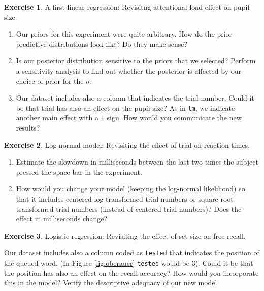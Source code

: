 \documentclass[12pt,]{krantz}
\providecommand{\tightlist}{%
  \setlength{\itemsep}{0pt}\setlength{\parskip}{0pt}}
\theoremstyle{definition}
\theoremstyle{definition}
\theoremstyle{definition}
\newtheorem{exercise}{Exercise}[chapter]
\theoremstyle{remark}
\begin{document}
\begin{exercise}
\protect\hypertarget{exr:pupils}{}{\label{exr:pupils} }A first linear regression: Revisitng attentional load effect on pupil size.
\end{exercise}

\begin{enumerate}
\def\labelenumi{\alph{enumi}.}
\tightlist
\item
  Our priors for this experiment were quite arbitrary. How do the prior predictive distributions look like? Do they make sense?
\item
  Is our posterior distribution sensitive to the priors that we selected? Perform a sensitivity analysis to find out whether the posterior is affected by our choice of prior for the \(\sigma\).
\item
  Our dataset includes also a column that indicates the trial number. Could it be that trial has also an effect on the pupil size? As in \texttt{lm}, we indicate another main effect with a \texttt{+} sign. How would you communicate the new results?
\end{enumerate}

\begin{exercise}
\protect\hypertarget{exr:lognormalm}{}{\label{exr:lognormalm} }Log-normal model: Revisiting the effect of trial on reaction times.
\end{exercise}

\begin{enumerate}
\def\labelenumi{\alph{enumi}.}
\tightlist
\item
  Estimate the slowdown in milliseconds between the last two times the subject pressed the space bar in the experiment.
\item
  How would you change your model (keeping the log-normal likelihood) so that it includes centered log-transformed trial numbers or square-root-transformed trial numbers (instead of centered trial numbers)? Does the effect in milliseconds change?
\end{enumerate}

\begin{exercise}
\protect\hypertarget{exr:reg-logistic}{}{\label{exr:reg-logistic} }Logistic regression: Revisiting the effect of set size on free recall.
\end{exercise}

Our dataset includes also a column coded as \texttt{tested} that indicates the position of the queued word. (In Figure \ref{fig:oberauer} \texttt{tested} would be 3). Could it be that the position has also an effect on the recall accuracy? How would you incorporate this in the model? Verify the descriptive adequacy of our new model.
\end{document}
